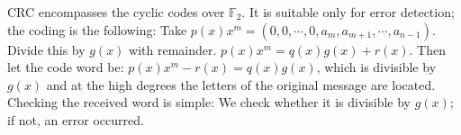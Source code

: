 \documentclass[margin=0px]{article}
\begin{document}
\begin{description}
        CRC encompasses the cyclic codes over $\mathbb{F}_2$. It is suitable only for error detection; the coding is the following: Take $p(x)x^m = (0,0,\cdots,0,a_m,a_{m+1},\cdots,a_{n-1})$. Divide this by $g(x)$ with remainder. $p(x)x^m = q(x)g(x)+r(x)$. Then let the code word be: $p(x)x^m-r(x) = q(x)g(x)$, which is divisible by $g(x)$ and at the high degrees the letters of the original message are located. Checking the received word is simple: We check whether it is divisible by $g(x)$; if not, an error occurred.
\end{description}
\end{document}
